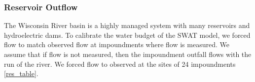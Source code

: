 \subsubsection{Reservoir Outflow}
The Wisconsin River basin is a highly managed system with many reservoirs and hydroelectric dams. To calibrate the water budget of the SWAT model, we forced flow to match observed flow at impoundments where flow is measured. We assume that if flow is not measured, then the impoundment outfall flows with the run of the river. We forced flow to observed at the sites of 24 impoundments \ref{res_table}.





